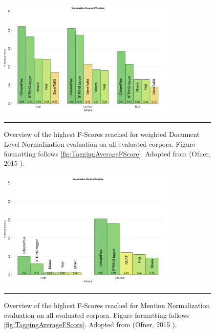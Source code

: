 \begin{figure}[htbp]
	\centering
    \includegraphics[width=3.5in]{Figures/eval/NormalizationDocumentWeightedOverview.png}
    \rule{35em}{0.5pt}
  \caption[Overview of the highest F-Scores in weighted Document Level Normalization evaluation]{Overview of the highest F-Scores reached for weighted Document Level Normalization evaluation on all evaluated corpora. Figure formatting follows \ref{fig:TaggingAverageFScore}. Adopted from (Ofner, 2015 \citep{ofner2015evaluation}).}
  \label{fig:AverageDocNormalizationFScore}
\end{figure}


\begin{figure}[htbp]
	\centering
    \includegraphics[width=3.5in]{Figures/eval/NormalizationMentionWeightedOverview.png}
    \rule{35em}{0.5pt}
  \caption[Overview of the highest F-Scores in Mention Normalization evaluation]{Overview of the highest F-Scores reached for Mention Normalization evaluation on all evaluated corpora. Figure formatting follows \ref{fig:TaggingAverageFScore}. Adopted from (Ofner, 2015 \citep{ofner2015evaluation}).}
  \label{fig:MentionNormalizationFScore}
\end{figure}

